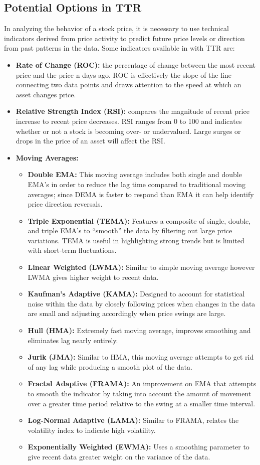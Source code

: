 \documentclass[11pt]{article}
\begin{document}
\subsection*{Potential Options in TTR}\label{PITTR}
In analyzing the behavior of a stock price, it is necessary to use technical indicators derived from price activity to predict future price levels or direction from past patterns in the data. Some indicators available in with TTR are:\textsuperscript{\cite{TTR}}
\begin{itemize}
\item \textbf{Rate of Change (ROC):} the percentage of change between the most recent price and the price n days ago. ROC is effectively the slope of the line connecting two data points and draws attention to the speed at which an asset changes price.
\item \textbf{Relative Strength Index (RSI):} compares the magnitude of recent price increase to recent price decreases. RSI ranges from 0 to 100 and indicates whether or not a stock is becoming over- or undervalued. Large surges or drops in the price of an asset will affect the RSI.
\item \textbf{Moving Averages:}
\begin{itemize}
\item \textbf{Double EMA:} This moving average includes both single and double EMA’s in order to reduce the lag time compared to traditional moving averages; since DEMA is faster to respond than EMA it can help identify price direction reversals.
\item \textbf{Triple Exponential (TEMA):} Features a composite of single, double, and triple EMA’s to “smooth” the data by filtering out large price variations. TEMA is useful in highlighting strong trends but is limited with short-term fluctuations.
\item \textbf{Linear Weighted (LWMA):} Similar to simple moving average however LWMA gives higher weight to recent data.
\item \textbf{Kaufman’s Adaptive (KAMA):} Designed to account for statistical noise within the data by closely following prices when changes in the data are small and adjusting accordingly when price swings are large.
\item \textbf{Hull (HMA):} Extremely fast moving average, improves smoothing and eliminates lag nearly entirely.
\item \textbf{Jurik (JMA):} Similar to HMA, this moving average attempts to get rid of any lag while producing a smooth plot of the data.
\item \textbf{Fractal Adaptive (FRAMA):} An improvement on EMA that attempts to smooth the indicator by taking into account the amount of movement over a greater time period relative to the swing at a smaller time interval.
\item \textbf{Log-Normal Adaptive (LAMA):} Similar to FRAMA, relates the volatility index to indicate high volatility.
\item \textbf{Exponentially Weighted (EWMA):} Uses a smoothing parameter to give recent data greater weight on the variance of the data.
\end{itemize}
\end{itemize}
\end{document}
